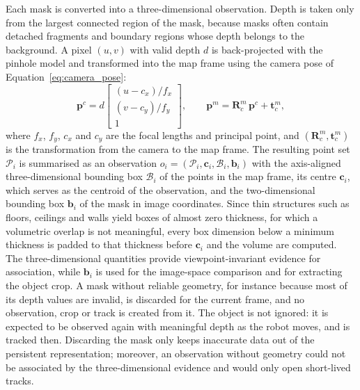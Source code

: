 {Each mask is converted into a three-dimensional observation. Depth is taken only from the largest connected region of the mask, because masks often contain detached fragments and boundary regions whose depth belongs to the background. A pixel $(u, v)$ with valid depth $d$ is back-projected with the pinhole model and transformed into the map frame using the camera pose of Equation~\ref{eq:camera_pose}:
\begin{equation}
	\mathbf{p}^{c} = d \begin{bmatrix} (u - c_x)/f_x \\ (v - c_y)/f_y \\ 1 \end{bmatrix},
	\qquad
	\mathbf{p}^{m} = \mathbf{R}^{m}_{c}\,\mathbf{p}^{c} + \mathbf{t}^{m}_{c},
	\label{eq:backprojection}
\end{equation}
where $f_x$, $f_y$, $c_x$ and $c_y$ are the focal lengths and principal point, and $(\mathbf{R}^{m}_{c}, \mathbf{t}^{m}_{c})$ is the transformation from the camera to the map frame. The resulting point set $\mathcal{P}_i$ is summarised as an observation $o_i = (\mathcal{P}_i, \mathbf{c}_i, \mathcal{B}_i, \mathbf{b}_i)$ with the axis-aligned three-dimensional bounding box $\mathcal{B}_i$ of the points in the map frame, its centre $\mathbf{c}_i$, which serves as the centroid of the observation, and the two-dimensional bounding box $\mathbf{b}_i$ of the mask in image coordinates. Since thin structures such as floors, ceilings and walls yield boxes of almost zero thickness, for which a volumetric overlap is not meaningful, every box dimension below a minimum thickness is padded to that thickness before $\mathbf{c}_i$ and the volume are computed. The three-dimensional quantities provide viewpoint-invariant evidence for association, while $\mathbf{b}_i$ is used for the image-space comparison and for extracting the object crop. A mask without reliable geometry, for instance because most of its depth values are invalid, is discarded for the current frame, and no observation, crop or track is created from it. The object is not ignored: it is expected to be observed again with meaningful depth as the robot moves, and is tracked then. Discarding the mask only keeps inaccurate data out of the persistent representation; moreover, an observation without geometry could not be associated by the three-dimensional evidence and would only open short-lived tracks.

}
